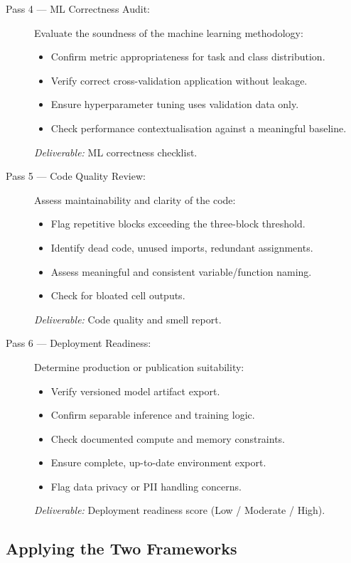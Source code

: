 \documentclass[11pt, a4paper]{article}
\begin{document}
\begin{description}
  \item[Pass 4 — ML Correctness Audit:]
  Evaluate the soundness of the machine learning methodology:
  \begin{itemize}
    \item Confirm metric appropriateness for task and class distribution.
    \item Verify correct cross-validation application without leakage.
    \item Ensure hyperparameter tuning uses validation data only.
    \item Check performance contextualisation against a meaningful baseline.
  \end{itemize}
  \textit{Deliverable:} ML correctness checklist.

  \item[Pass 5 — Code Quality Review:]
  Assess maintainability and clarity of the code:
  \begin{itemize}
    \item Flag repetitive blocks exceeding the three-block threshold.
    \item Identify dead code, unused imports, redundant assignments.
    \item Assess meaningful and consistent variable/function naming.
    \item Check for bloated cell outputs.
  \end{itemize}
  \textit{Deliverable:} Code quality and smell report.

  \item[Pass 6 — Deployment Readiness:]
  Determine production or publication suitability:
  \begin{itemize}
    \item Verify versioned model artifact export.
    \item Confirm separable inference and training logic.
    \item Check documented compute and memory constraints.
    \item Ensure complete, up-to-date environment export.
    \item Flag data privacy or PII handling concerns.
  \end{itemize}
  \textit{Deliverable:} Deployment readiness score (Low / Moderate / High).

\end{description}

\subsection*{Applying the Two Frameworks}
\label{sec:applying}
\end{document}
